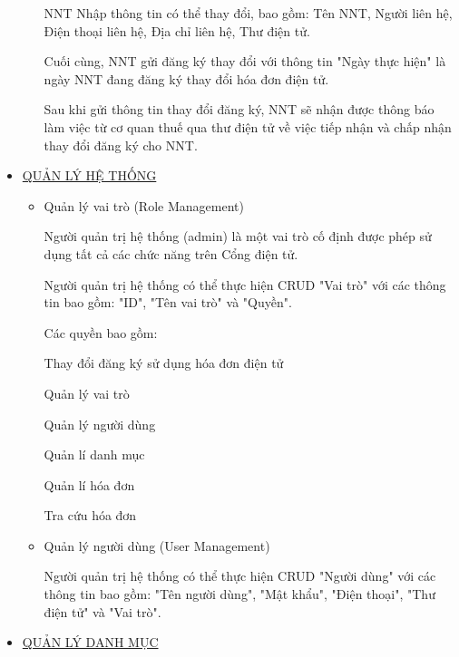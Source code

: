 \begin{itemize}
\begin{itemize}
                    NNT Nhập thông tin có thể thay đổi, bao gồm: Tên NNT, Người liên hệ, Điện thoại liên hệ, Địa chỉ liên hệ, Thư điện tử.

                    Cuối cùng, NNT gửi đăng ký thay đổi với thông tin "Ngày thực hiện" là ngày NNT đang đăng ký thay đổi hóa đơn điện tử.

                    Sau khi gửi thông tin thay đổi đăng ký, NNT sẽ nhận được thông báo làm việc từ cơ quan thuế qua thư điện tử về việc tiếp nhận và chấp nhận thay đổi đăng ký cho NNT.

          \end{itemize}

    \item \underline{QUẢN LÝ HỆ THỐNG}

          \begin{itemize}

              \item Quản lý vai trò (Role Management)

                    Người quản trị hệ thống (admin) là một vai trò cố định được phép sử dụng tất cả các chức năng trên Cổng điện tử.

                    Người quản trị hệ thống có thể thực hiện CRUD "Vai trò" với các thông tin bao gồm: "ID", "Tên vai trò" và "Quyền".

                    Các quyền bao gồm:

                    Thay đổi đăng ký sử dụng hóa đơn điện tử

                    Quản lý vai trò

                    Quản lý người dùng

                    Quản lí danh mục

                    Quản lí hóa đơn

                    Tra cứu hóa đơn

              \item Quản lý người dùng (User Management)

                    Người quản trị hệ thống có thể thực hiện CRUD "Người dùng" với các thông tin bao gồm: "Tên người dùng", "Mật khẩu", "Điện thoại", "Thư điện tử" và "Vai trò".

          \end{itemize}

    \item \underline{QUẢN LÝ DANH MỤC}

          \begin{itemize}


\end{itemize}
\end{itemize}
